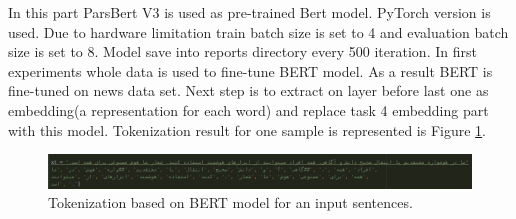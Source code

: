 \label{chapter:discussion}

In this part ParsBert V3 is used as pre-trained Bert model. PyTorch version is used. Due to hardware limitation train batch size is set to 4 and evaluation batch size is set to 8.
Model save into reports directory every 500 iteration. In first experiments whole data is used to fine-tune BERT model. As a result BERT is fine-tuned on news data set. Next step is to extract on layer before last one as embedding(a representation for each word) and replace task 4 embedding part with this model. 
Tokenization result for one sample is represented is Figure \ref{fig:fine}.

\begin{figure}
	\centering
	\includegraphics[width=15cm]{images/tkn.png}
	\caption{Tokenization based on BERT model for an input sentences.}
	\label{fig:fine}
\end{figure}